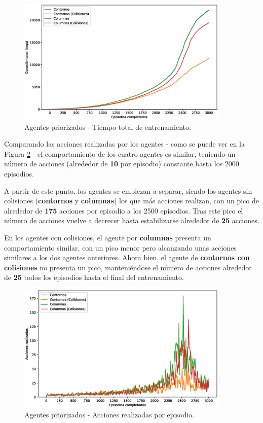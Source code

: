 \begin{figure}[h]
    \centering
    \includegraphics[width=0.9\textwidth]{imagenes/cap6/prioritized/cumulative_smoothed_times.eps}
    \caption{Agentes priorizados - Tiempo total de entrenamiento.}
    \label{fig:chap6-prioritized-time}
\end{figure}

Comparando las acciones realizadas por los agentes - como se puede ver en la Figura \ref{fig:chap6-prioritized-actions} - el comportamiento de los cuatro agentes es similar, teniendo un número de acciones (alrededor de \textbf{10} por episodio) constante hasta los 2000 episodios.

A partir de este punto, los agentes se empiezan a separar, siendo los agentes sin colisiones (\textbf{contornos} y \textbf{columnas}) los que más acciones realizan, con un pico de alrededor de \textbf{175} acciones por episodio a los 2500 episodios. Tras este pico el número de acciones vuelve a decrecer hasta estabilizarse alrededor de \textbf{25} acciones.

En los agentes con colisiones, el agente por \textbf{columnas} presenta un comportamiento similar, con un pico menor pero alcanzando unas acciones similares a los dos agentes anteriores. Ahora bien, el agente de \textbf{contornos con colisiones} no presenta un pico, manteniéndose el número de acciones alrededor de \textbf{25} todos los episodios hasta el final del entrenamiento.

\begin{figure}[h]
    \centering
    \includegraphics[width=0.9\textwidth]{imagenes/cap6/prioritized/smoothed_actions.eps}
    \caption{Agentes priorizados - Acciones realizadas por episodio.}
    \label{fig:chap6-prioritized-actions}
\end{figure}

